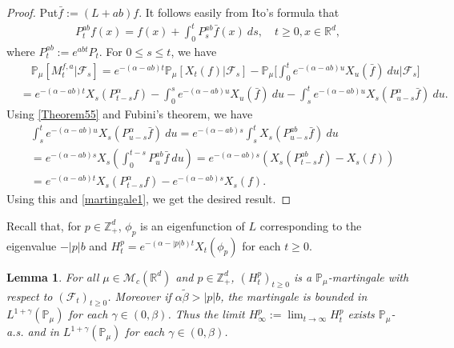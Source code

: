 \documentclass[12pt,a4paper]{amsart}
\theoremstyle{plain}
\newtheorem{lem}[thm]{Lemma}
\theoremstyle{definition}
\numberwithin{equation}{section}
\begin{document}
\begin{proof}
  Put$\bar{f} :=(L+ab)f$.
  It follows easily from Ito's formula that
  \begin{align}
    \label{Theorem55}
    P_t^{ab}f(x)
    = f(x)+\int_0^t P_s^{ab}\bar{f}(x)~ds,\quad t\geq 0,x\in \mathbb R^d,
  \end{align}
  where $P_t^{ab} := e^{abt}P_t$.
  For $0\leq s\leq t$, we have
  \begin{align}
    \label{martingale1}
    & \quad\mathbb{P}_{\mu}[M_t^{f,a}|\mathscr{F}_s]
    =e^{-(\alpha-ab)t}\mathbb{P}_{\mu}\left[X_t(f)|\mathscr{F}_s\right]-\mathbb{P}_{\mu}\Big[\int_0^t e^{-(\alpha-ab)u}X_u(\bar{f})~ du\Big|\mathscr{F}_s\big] \\
    & =e^{-(\alpha-ab)t} X_s(P_{t-s}^{\alpha}f)-\int_0^s e^{-(\alpha-ab)u} X_u(\bar{f})~ du - \int_s^t e^{-(\alpha-ab)u}X_s(P_{u-s}^{\alpha} \bar{f})~ du.
  \end{align}
  Using \eqref{Theorem55} and Fubini's theorem, we have
  \begin{align}
    & \int_s^t e^{-(\alpha-ab)u}X_s(P_{u-s}^{\alpha} \bar{f})~ du=e^{-(\alpha-ab)s}\int_s^tX_s(P_{u-s}^{ab}\bar{f})~du\\
    & = e^{ - ( \alpha - ab ) s } X_s\left( \int_0^{t-s} P_{u}^{ab} \bar{f}~ du\right)
      = e^{-(\alpha-ab)s}\left(X_s(P_{t-s}^{ab}f) - X_s(f) \right) \\
    & = e^{-(\alpha-ab)t} X_s( P_{t-s}^{\alpha}f) - e^{ - ( \alpha - ab ) s} X_s(f).
  \end{align}
  Using this and \eqref{martingale1}, we get the desired result.
\end{proof}

Recall that, for $p\in \mathbb Z_+^d$,  $\phi_p$ is an eigenfunction of $L$ corresponding to the eigenvalue $-|p|b$ and $ H_t^p =e^{-(\alpha-|p|b)t}X_t(\phi_p)$ for each $t\geq 0$.

\begin{lem}
  \label{lem:M:L:ML}
   For all $\mu\in \mathcal M_c(\mathbb R^d)$ and $p \in \mathbb Z_+^d$, $(H^p_t)_{t\geq 0}$ is a $\mathbb P_{\mu}$-martingale with respect to $(\mathscr F_t)_{t\geq 0}$.
    Moreover if $\alpha\tilde \beta>|p|b$, the martingale is bounded in $L^{1+\gamma}(\mathbb P_\mu)$ for each $\gamma\in (0, \beta)$.
  Thus the limit $ H_{\infty}^p := \lim_{t\rightarrow \infty}H_t^p $  exists $\mathbb{P}_{\mu}$-a.s. and in $L^{1+\gamma}(\mathbb{P}_{\mu})$ for each $\gamma \in (0,\beta)$.
\end{lem}
\end{document}
